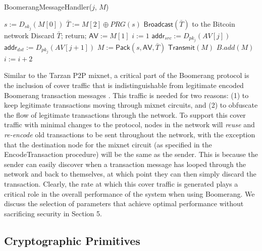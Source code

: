 \begin{algorithm*}[t!]
\caption{{\sf BoomerangMessageHandler}($j$, $M$)}
\label{alg:handler}
\begin{algorithmic}[1]

\State $s := D_{sk_{j}}(M[0])$
\State $\bar{T} := M[2] \oplus PRG(s)$
	\State $\mathsf{Broadcast}(\bar{T})$ to the Bitcoin network
	\State Discard $\bar{T}$; return;
\Else
	\State $\mathsf{AV} := M[1]$
	\State $i := 1$
		\State $\mathsf{addr}_{src} := D_{pk_j}(AV[j])$
			\State $\mathsf{addr}_{dst} := D_{pk_j}(AV[j + 1])$
			\State $M := \mathsf{Pack}(s, \mathsf{AV}, \bar{T})$
				\State $\mathsf{Transmit}(M)$
			\Else
				\State $B.add(M)$
			\EndIf
		\Else
			\State $i := i + 2$
		\EndIf
	\EndWhile
\EndIf

\end{algorithmic}
\end{algorithm*}


Similar to the Tarzan P2P mixnet, a critical part of the Boomerang protocol is the inclusion of cover traffic that is indistinguishable from legitimate encoded Boomerang transaction messages \cite{tarzan}. This traffic is needed for two reasons: (1) to keep legitimate transactions moving through mixnet circuits, and (2) to obfuscate the flow of legitimate transactions through the network. To support this cover traffic with minimal changes to the protocol, nodes in the network will \emph{reuse} and \emph{re-encode} old transactions to be sent throughout the network, with the exception that the destination node for the mixnet circuit (as specified in the {\sf EncodeTransaction} procedure) will be the same as the sender. This is because the sender can easily discover when a transaction message has looped through the network and back to themselves, at which point they can then simply discard the transaction. Clearly, the rate at which this cover traffic is generated plays a critical role in the overall performance of the system when using Boomerang. We discuss the selection of parameters that achieve optimal performance without sacrificing security in Section 5. 

\subsection{Cryptographic Primitives}

